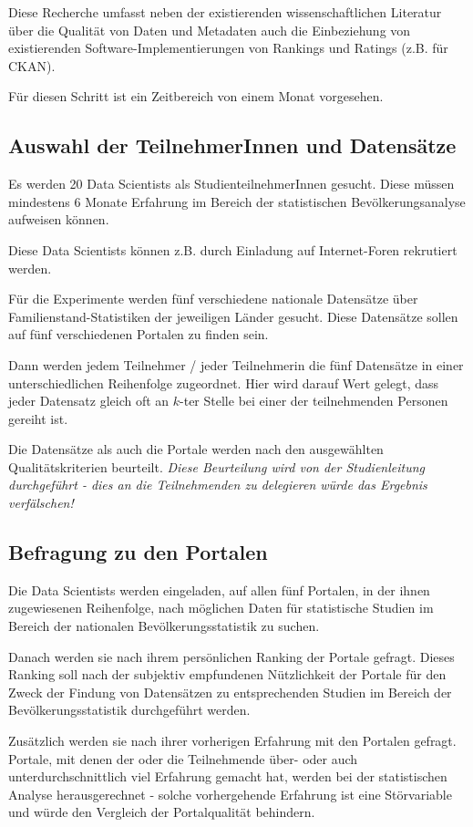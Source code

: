 \documentclass[a4paper,10pt,german,public]{INSOexpose}
\begin{document}
Diese Recherche umfasst neben der existierenden wissenschaftlichen
Literatur über die Qualität von Daten und Metadaten auch die
Einbeziehung von existierenden Software-Implementierungen
von Rankings und Ratings (z.B. für CKAN).

Für diesen Schritt ist ein Zeitbereich von einem Monat
vorgesehen.

\subsection{Auswahl der TeilnehmerInnen und Datensätze}

Es werden 20 Data Scientists als StudienteilnehmerInnen gesucht.
Diese müssen mindestens 6 Monate Erfahrung im Bereich der
statistischen Bevölkerungsanalyse aufweisen können.

Diese Data Scientists können z.B. durch Einladung auf Internet-Foren
rekrutiert werden.

Für die Experimente werden fünf verschiedene nationale Datensätze
über Familienstand-Statistiken der jeweiligen Länder gesucht.
Diese Datensätze sollen auf fünf verschiedenen Portalen zu finden sein.

Dann werden jedem Teilnehmer / jeder Teilnehmerin die fünf Datensätze
in einer unterschiedlichen Reihenfolge zugeordnet.
Hier wird darauf Wert gelegt, dass jeder Datensatz gleich oft an
$k$-ter Stelle bei einer der teilnehmenden Personen gereiht ist.

Die Datensätze als auch die Portale werden nach den ausgewählten
Qualitätskriterien beurteilt. \emph{Diese Beurteilung wird von 
der Studienleitung durchgeführt - dies an die Teilnehmenden zu
delegieren würde das Ergebnis verfälschen!}

\subsection{Befragung zu den Portalen}

Die Data Scientists werden eingeladen, auf allen fünf Portalen,
in der ihnen zugewiesenen Reihenfolge, nach möglichen Daten
für statistische Studien im Bereich der nationalen
Bevölkerungsstatistik zu suchen.

Danach werden sie nach ihrem persönlichen Ranking der Portale
gefragt.
Dieses Ranking soll nach der subjektiv empfundenen Nützlichkeit der
Portale für den Zweck der Findung von Datensätzen zu entsprechenden
Studien im Bereich der Bevölkerungsstatistik durchgeführt werden.

Zusätzlich werden sie nach ihrer vorherigen Erfahrung mit den Portalen
gefragt. Portale, mit denen der oder die Teilnehmende über- oder
auch unterdurchschnittlich viel Erfahrung gemacht hat, werden bei der
statistischen Analyse herausgerechnet - solche vorhergehende
Erfahrung ist eine Störvariable und würde den Vergleich der
Portalqualität behindern.
\end{document}
